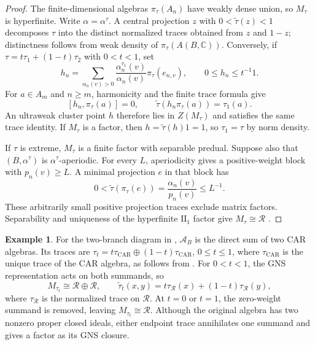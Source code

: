 \documentclass[11pt]{amsart}
\theoremstyle{definition}
\newtheorem{example}[theorem]{Example}
\theoremstyle{remark}
\begin{document}
\begin{proof}
The finite-dimensional algebras $\pi_\tau(A_n)$ have weakly dense
union, so $M_\tau$ is hyperfinite.  Write $\alpha=\alpha^\tau$.
A central projection $z$ with $0<\widetilde\tau(z)<1$
decomposes $\tau$ into the distinct normalized traces obtained from
$z$ and $1-z$; distinctness follows from weak density of
$\pi_\tau(A(B,\mathbb C))$.
Conversely, if $\tau=t\tau_1+(1-t)\tau_2$ with $0<t<1$, set
\[
 h_n=\sum_{\alpha_n(v)>0}
 \frac{\alpha_n^{\tau_1}(v)}{\alpha_n(v)}\pi_\tau(e_{n,v}),
 \qquad 0\leq h_n\leq t^{-1}1.
\]
For $a\in A_m$ and $n\geq m$, harmonicity and the finite trace formula give
\[
 [h_n,\pi_\tau(a)]=0,\qquad
 \widetilde\tau(h_n\pi_\tau(a))=\tau_1(a).
\]
An ultraweak cluster point $h$ therefore lies in $Z(M_\tau)$ and
satisfies the same trace identity.  If $M_\tau$ is a factor, then
$h=\widetilde\tau(h)1=1$, so $\tau_1=\tau$ by norm density.

If $\tau$ is extreme, $M_\tau$ is a finite factor with separable
predual.  Suppose also that $(B,\alpha^\tau)$ is
$\alpha^\tau$-aperiodic.
For every $L$, aperiodicity gives a positive-weight block with
$p_n(v)\geq L$.  A minimal projection $e$ in that block has
\[
 0<\widetilde\tau(\pi_\tau(e))=\frac{\alpha_n(v)}{p_n(v)}\leq L^{-1}.
\]
These arbitrarily small positive projection traces exclude matrix
factors.  Separability and uniqueness of the hyperfinite $\mathrm{II}_1$ factor give $M_\tau\cong\mathcal R$
\cite{MurrayVonNeumann1943}.
\end{proof}

\begin{example}\label{ex:two-branch-gns}
For the two-branch diagram in ,
$\mathcal A_B$ is the direct sum of two CAR algebras.
Its traces are $\tau_t=t\tau_{\mathrm{CAR}}\oplus(1-t)\tau_{\mathrm{CAR}}$,
$0\leq t\leq1$, where $\tau_{\mathrm{CAR}}$ is the unique trace of the CAR algebra,
as follows from .
For $0<t<1$, the GNS representation acts on both summands, so
\[
 M_{\tau_t}\cong\mathcal R\oplus\mathcal R,\qquad
 \widetilde\tau_t(x,y)=t\tau_{\mathcal R}(x)+(1-t)\tau_{\mathcal R}(y),
\]
where $\tau_{\mathcal R}$ is the normalized trace on $\mathcal R$.
At $t=0$ or $t=1$, the zero-weight summand is removed, leaving
$M_{\tau_t}\cong\mathcal R$.
Although the original algebra has two nonzero proper closed ideals,
either endpoint trace annihilates one summand and gives a factor
as its GNS closure.
\end{example}
\end{document}
